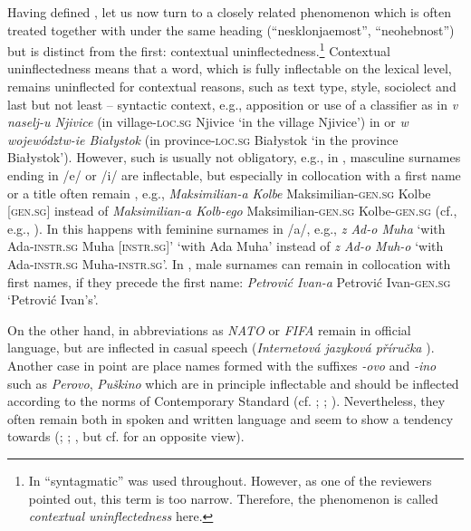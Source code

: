 \documentclass[output=paper,colorlinks,citecolor=brown]{langscibook}
\begin{document}
Having defined , let us now turn to a closely related phenomenon which is often treated together with  under the same heading (``nesklonjaemost'', ``neohebnost'') but is distinct from the first: contextual uninflectedness.\footnote{In \citet{doleschal2000} “syntagmatic” was used throughout. However, as one of the reviewers pointed out, this term is too narrow. Therefore, the phenomenon is called \textit{contextual uninflectedness} here.} Contextual uninflectedness means that a word, which is fully inflectable on the lexical level, remains uninflected for contextual reasons, such as text type, style, sociolect and last but not least -- syntactic context, e.g., apposition or use of a classifier as in \emph{v naselj-u Njivice} (in village-\textsc{loc.sg} Njivice `in the village Njivice') in  or \emph{w województw-ie Białystok} (in province-\textsc{loc.sg} Białystok `in the province Białystok'). However, such  is usually not obligatory, e.g., in , masculine surnames ending in /e/ or /i/ are inflectable, but especially in collocation with a first name or a title often remain , e.g., \emph{Maksimilian-a Kolbe} Maksimilian-\textsc{gen.sg} Kolbe [\textsc{gen.sg}] instead of \emph{Maksimilian-a Kolb-ego} Maksimilian-\textsc{gen.sg} Kolbe-\textsc{gen.sg} (cf., e.g., \citealt[39--40]{krzyzanowski2013}). In  this happens with feminine surnames in /a/, e.g., \emph{z Ad-o Muha} `with Ada-\textsc{instr.sg} Muha [\textsc{instr.sg}]' `with Ada Muha' instead of \emph{z Ad-o \mbox{Muh-o}} `with Ada-\textsc{instr.sg} Muha-\textsc{instr.sg}'. In , male surnames can remain  in collocation with first names, if they precede the first name: \emph{Petrović Ivan-a} Petrović Ivan-\textsc{gen.sg} `Petrović Ivan's'.

On the other hand, in  abbreviations as \emph{NATO} or \emph{FIFA} remain  in official language, but are inflected in casual speech (\emph{Internetová jazyková příruč\-ka} \citeyear{ujc2024-zkratkovaslova}). Another case in point are  place names formed with the suffixes \emph{-ovo} and \emph{-ino} such as \emph{Perovo}, \emph{Puškino} which are in principle inflectable and should be inflected according to the norms of Contemporary Standard  (cf. \citealt{paxomov-nodate, redakcijaportalagramotaru}; \citealt[739]{zaliznjak2008}; \citealt[35]{ageenko2010}). Nevertheless, they often remain  both in spoken and written language and seem to show a tendency towards  (\citealt[156--159]{graudina1980}; \citealt[56--59]{panov1968}; \citealt[739]{zaliznjak2008}, but cf. \citealt{tejkin2021} for an opposite view).
\end{document}
